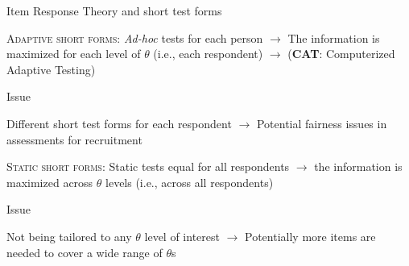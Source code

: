 \documentclass{beamer} %
\begin{document}
\begin{frame}{Item Response Theory and short test forms}

\textsc{\textcolor{template}{Adaptive short forms}}: \emph{Ad-hoc} tests for each person \textcolor{template}{$\rightarrow$} The information is maximized for each level of $\theta$ (i.e., each respondent) \textcolor{template}{$\rightarrow$} (\textcolor{template}{\textbf{CAT}}: Computerized Adaptive Testing)
		
		\begin{alertblock}{Issue}
			
		Different short test forms for each respondent $\rightarrow$ Potential fairness issues in assessments for recruitment
		\end{alertblock}
		
\textcolor{template}{\textsc{Static short forms}}: Static tests equal for all respondents \textcolor{template}{$\rightarrow$} the information is maximized across $\theta$ levels (i.e., across all respondents)
		
		\begin{alertblock}{Issue}
		
		Not being tailored to any $\theta$ level of interest \textcolor{template}{$\rightarrow$} Potentially more items are needed to  cover a wide range of $\theta$s
		\end{alertblock}


\end{frame}
\end{document}
